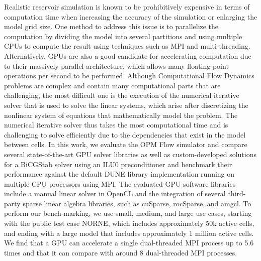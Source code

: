 Realistic reservoir simulation is known to be prohibitively expensive in terms of computation time when increasing the accuracy of the simulation or enlarging the model grid size. One method to address this issue is to parallelize the computation by dividing the model into several partitions and using multiple CPUs to compute the result using techniques such as MPI and multi-threading. Alternatively, GPUs are also a good candidate for accelerating computation due to their massively parallel architecture, which allows many floating point operations per second to be performed. Although Computational Flow Dynamics problems are complex and contain many computational parts that are challenging, the most difficult one is the execution of the numerical iterative solver that is used to solve the linear systems, which arise after discretizing the nonlinear system of equations that mathematically model the problem. The numerical iterative solver thus takes the most computational time and is challenging to solve efficiently due to the dependencies that exist in the model between cells. In this work, we evaluate the OPM Flow simulator and compare several state-of-the-art GPU solver libraries as well as custom-developed solutions for a BiCGStab solver using an ILU0 preconditioner and benchmark their performance against the default DUNE library implementation running on multiple CPU processors using MPI. The evaluated GPU software libraries include a manual linear solver in OpenCL and the integration of several third-party sparse linear algebra libraries, such as cuSparse, rocSparse, and amgcl. To perform our bench-marking, we use small, medium, and large use cases, starting with the public test case NORNE, which includes approximately 50k active cells, and ending with a large model that includes approximately 1 million active cells. We find that a GPU can accelerate a single dual-threaded MPI process up to 5.6 times and that it can compare with around 8 dual-threaded MPI processes.  

